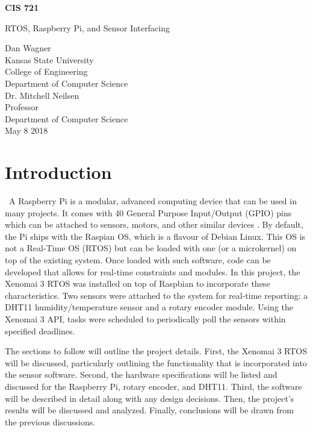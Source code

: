 \documentclass[letterpaper, 12pt]{article}
\begin{document}
	\begin{titlepage}
		\centering
		\vspace*{5.75cm}
		{\huge\bfseries CIS 721\par}
		{\large RTOS, Raspberry Pi, and Sensor Interfacing\par}
		\vspace{2cm}
		Dan Wagner\\
		Kansas State University\\
		College of Engineering\\
		Department of Computer Science\\
		\vspace{1cm}
		Dr. Mitchell Neilsen\\
		Professor\\
		Department of Computer Science\\
		\vspace{1cm}
		May 8 2018
	\end{titlepage}

\section{Introduction}
~\indent A Raspberry Pi is a modular, advanced computing device that can be used in many projects.  It comes with 40 General Purpose Input/Output (GPIO) pins which can be attached to sensors, motors, and other similar devices \cite{raspberrypifoundation2018}.  By default, the Pi ships with the Raspian OS, which is a flavour of Debian Linux.  This OS is not a Real-Time OS (RTOS) but can be loaded with one (or a microkernel) on top of the existing system.  Once loaded with such software, code can be developed that allows for real-time constraints and modules.  In this project, the Xenomai 3 RTOS was installed on top of Raspbian to incorporate these characteristics.  Two sensors were attached to the system for real-time reporting: a DHT11 humidity/temperature sensor and a rotary encoder module.  Using the Xenomai 3 API, tasks were scheduled to periodically poll the sensors within specified deadlines.

The sections to follow will outline the project details.  First, the Xenomai 3 RTOS will be discussed, particularly outlining the functionality that is incorporated into the sensor software.  Second, the hardware specifications will be listed and discussed for the Raspberry Pi, rotary encoder, and DHT11.  Third, the software will be described in detail along with any design decisions.  Then, the project's results will be discussed and analyzed.  Finally, conclusions will be drawn from the previous discussions.
~\newline
\end{document}
